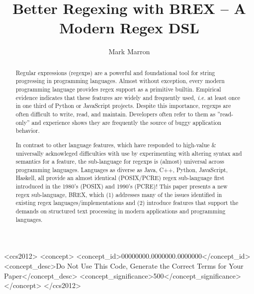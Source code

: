 \documentclass[sigplan,10pt,review]{acmart}
\newcommand{\ie}{\hbox{\emph{i.e.}}\xspace}
\begin{document}
\title{Better Regexing with BREX -- A Modern Regex DSL}

\author{Mark Marron}

\begin{abstract}
Regular expressions (regexps) are a powerful and foundational tool for string progressing in programming languages. Almost without 
exception, every modern programming language provides regex support as a primitive builtin. Empirical evidence indicates that these 
features are widely and frequently used, \ie at least once in one third of Python or JavaScript projects. Despite this importance, 
regexps are often difficult to write, read, and maintain. Developers often refer to them as ''read-only'' and experience shows they 
are frequently the source of buggy application behavior. 

In contrast to other language features, which have responded to high-value \& universally acknowleged difficulties with use by experimenting 
with altering syntax and semantics for a feature, the sub-language for regexps is (almost) universal across programming languages. Languages 
as diverse as Java, C++, Python, JavaScript, Haskell, all provide an almost identical (POSIX/PCRE) regex sub-language first introduced in 
the 1980's (POSIX) and 1990's (PCRE)! This paper presents a new regex sub-language, BREX, which (1) addresses many of the issues identified 
in existing regex languages/implementations and (2) introduce features that support the demands on structured text processing in modern 
applications and programming languages.
\end{abstract}

\begin{CCSXML}
<ccs2012>
 <concept>
  <concept_id>00000000.0000000.0000000</concept_id>
  <concept_desc>Do Not Use This Code, Generate the Correct Terms for Your Paper</concept_desc>
  <concept_significance>500</concept_significance>
 </concept>
</ccs2012>
\end{CCSXML}

\end{document}
